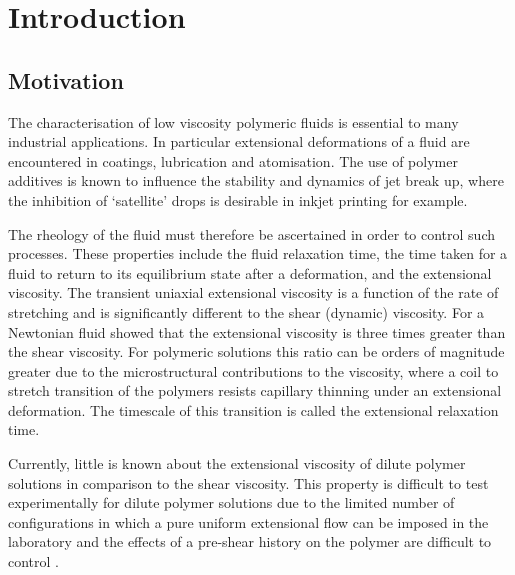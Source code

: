 \documentclass[11pt]{article}
\begin{document}
\section{Introduction}

\subsection{Motivation}
The characterisation of low viscosity polymeric fluids is essential to many 
industrial applications. In particular extensional deformations of a fluid are 
encountered in coatings, lubrication and atomisation. The use of polymer 
additives is known to influence the stability and dynamics of jet break up, 
where the inhibition of `satellite' drops is desirable in inkjet printing for 
example.

The rheology of the fluid must therefore be ascertained in order to control 
such processes. These properties include the fluid relaxation time, the time 
taken for a fluid to return to its equilibrium state after a deformation, and 
the extensional viscosity. The transient uniaxial extensional viscosity is a 
function of the rate of stretching and is significantly different to the shear 
(dynamic) viscosity. For a Newtonian fluid \cite{fred1906coefficient} showed 
that the extensional viscosity is three times greater than the shear viscosity. 
For polymeric solutions this ratio can be orders of magnitude greater due to 
the microstructural contributions to the viscosity, where a coil to stretch 
transition of the polymers resists capillary thinning under an extensional 
deformation. The timescale of this transition is called the extensional 
relaxation time.

Currently, little is known about the extensional viscosity of dilute polymer 
solutions in comparison to the shear viscosity. This property is difficult to 
test experimentally for dilute polymer solutions due to the limited number of 
configurations in which a pure uniform extensional flow can be imposed in the 
laboratory and the effects of a pre-shear history on the polymer are difficult 
to control \citep{petrie2006extensional}.
\end{document}
